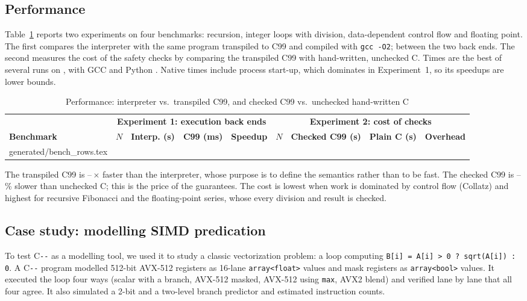 \documentclass[conference]{IEEEtran}
\makeatletter
\newcommand{\inputrows}[1]{\@@input #1 }
\newcommand{\cmm}{C\texttt{-{}-}}
\makeatother
\begin{document}
\subsection{Performance}
Table~\ref{tab:perf} reports two experiments on four benchmarks: recursion, integer loops with division,
data-dependent control flow and floating point. The first compares the interpreter with the same program
transpiled to C99 and compiled with \texttt{gcc -O2}; \benchAllMatch{} between the two back ends. The second
measures the cost of the safety checks by comparing the transpiled C99 with hand-written, unchecked C. Times
are the best of several runs on \benchCPU{}, with GCC \benchCC{} and Python \benchPython{}. Native times
include process start-up, which dominates in Experiment~1, so its speedups are lower bounds.

\begin{table}[t]
\caption{Performance: interpreter vs.\ transpiled C99, and checked C99 vs.\ unchecked hand-written C}
\label{tab:perf}
\centering
\footnotesize
\begin{tabular}{@{}l r r r r r r r r@{}}
\toprule
 & \multicolumn{4}{c}{\textbf{Experiment 1: execution back ends}} & \multicolumn{4}{c}{\textbf{Experiment 2: cost of checks}} \\
\cmidrule(lr){2-5}\cmidrule(l){6-9}
\textbf{Benchmark} & $N$ & \textbf{Interp. (s)} & \textbf{C99 (ms)} & \textbf{Speedup} & $N$ & \textbf{Checked C99 (s)} & \textbf{Plain C (s)} & \textbf{Overhead} \\
\midrule
\inputrows{generated/bench_rows.tex}
\bottomrule
\end{tabular}
\end{table}

The transpiled C99 is \benchSpeedupMin--\benchSpeedupMax\,$\times$ faster than the interpreter, whose purpose
is to define the semantics rather than to be fast. The checked C99 is \benchOverheadMin--\benchOverheadMax\%
slower than unchecked C; this is the price of the guarantees. The cost is lowest when work is dominated by
control flow (Collatz) and highest for recursive Fibonacci and the floating-point series, whose every division
and result is checked.

\subsection{Case study: modelling SIMD predication}
To test \cmm{} as a modelling tool, we used it to study a classic vectorization problem: a loop computing
\texttt{B[i] = A[i] > 0 ? sqrt(A[i]) : 0}. A \cmm{} program modelled 512-bit AVX-512 registers as 16-lane
\texttt{array<float>} values and mask registers as \texttt{array<bool>} values. It executed the loop four ways
(scalar with a branch, AVX-512 masked, AVX-512 using \texttt{max}, AVX2 blend) and verified lane by lane that
all four agree. It also simulated a 2-bit and a two-level branch predictor and estimated instruction counts.
\end{document}
